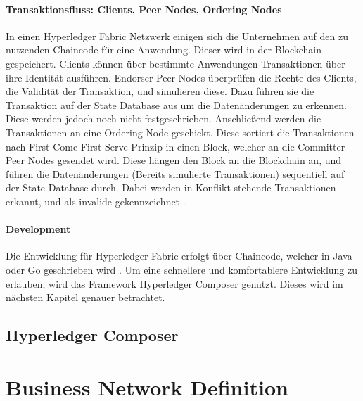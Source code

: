 \paragraph{Transaktionsfluss: Clients, Peer Nodes, Ordering Nodes}
In einen Hyperledger Fabric Netzwerk einigen sich die Unternehmen auf den zu nutzenden Chaincode für eine Anwendung. Dieser wird in der Blockchain gespeichert. Clients können über bestimmte Anwendungen Transaktionen über ihre Identität ausführen. Endorser Peer Nodes überprüfen die Rechte des Clients, die Validität der Transaktion, und simulieren diese. Dazu führen sie die Transaktion auf der State Database aus um die Datenänderungen zu erkennen. Diese werden jedoch noch nicht festgeschrieben. Anschließend werden die Transaktionen an eine Ordering Node geschickt. Diese sortiert die Transaktionen nach First-Come-First-Serve Prinzip in einen Block, welcher an die Committer Peer Nodes gesendet wird. Diese hängen den Block an die Blockchain an, und führen die Datenänderungen (Bereits simulierte Transaktionen) sequentiell auf der State Database durch. Dabei werden in Konflikt stehende Transaktionen erkannt, und als invalide gekennzeichnet \cite{SchererPerformanceScalabilityBlockchain2017}.

\paragraph{Development}
Die Entwicklung für Hyperledger Fabric erfolgt über Chaincode, welcher in Java oder Go geschrieben wird \cite{SDKsHyperledgerFabric}. Um eine schnellere und komfortablere Entwicklung zu erlauben, wird das Framework Hyperledger Composer genutzt. Dieses wird im nächsten Kapitel genauer betrachtet.


\subsection{Hyperledger Composer}

\section{Business Network Definition}

